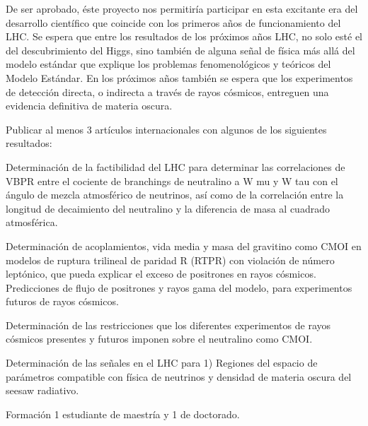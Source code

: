 De ser aprobado, éste proyecto nos permitiría participar en esta
excitante era del desarrollo científico que coincide con
los primeros años de funcionamiento del LHC.  Se espera que entre los
resultados de los próximos años LHC, no solo esté el del
descubrimiento del Higgs, sino también de alguna señal de física más
allá del modelo estándar que explique los problemas fenomenológicos y
teóricos del Modelo Estándar. En los próximos años también se espera
que los experimentos de detección directa, o indirecta a través de
rayos cósmicos, entreguen una evidencia definitiva de materia oscura.


\begin{ideas}
  
Publicar al menos 3 artículos internacionales con algunos de los siguientes resultados:

Determinación de la factibilidad del LHC para determinar las correlaciones de VBPR entre el cociente de branchings de neutralino a W mu y W tau con el ángulo de mezcla atmosférico de neutrinos, así como de la correlación entre la longitud de decaimiento del neutralino y la diferencia de masa al cuadrado atmosférica.

Determinación de acoplamientos, vida media y masa del gravitino como CMOI en modelos de ruptura trilineal de paridad R (RTPR) con violación de número leptónico, que pueda explicar el exceso de positrones en rayos cósmicos. Predicciones de flujo de positrones y rayos gama del modelo, para experimentos futuros de rayos cósmicos. 

Determinación de las restricciones que los diferentes experimentos de rayos cósmicos 
presentes y futuros imponen sobre el neutralino como CMOI. 

Determinación de las señales en el LHC para 1) Regiones del espacio de parámetros compatible con física de neutrinos y densidad de materia oscura del seesaw radiativo. 

Formación 1 estudiante de maestría y 1 de doctorado.

\end{ideas}

